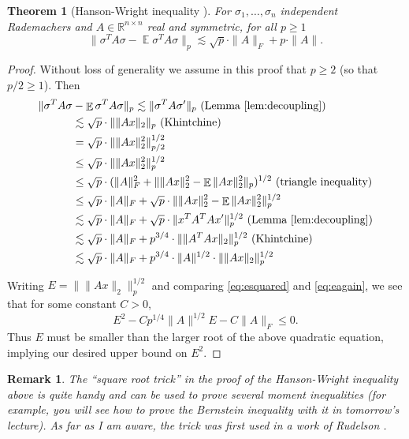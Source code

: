 \documentclass[12pt]{article}
\DeclareMathOperator*{\E}{\mathbb{E}}
\newcommand{\R}{\mathbb{R}}
\newtheorem{theorem}{Theorem}
\newtheorem{remark}{Remark}
\newcommand{\EquationName}[1]{\label{eq:#1}}
\newcommand{\TheoremName}[1]{\label{thm:#1}}
\newcommand{\Lemma}[1]{Lemma~\ref{lem:#1}}
\newcommand{\Eqsub}[1]{\eqref{eq:#1}}
\begin{document}
\begin{theorem}[Hanson-Wright inequality {\cite{HansonW71}}]\TheoremName{hw}
For $\sigma_1,\ldots,\sigma_n$ independent Rademachers and $A\in\R^{n\times n}$ real and symmetric, for all $p\ge 1$
$$
\|\sigma^T A \sigma - \E \sigma^T A \sigma\|_p \lesssim \sqrt{p} \cdot \|A\|_F + p\cdot \|A\| .
$$
\end{theorem}
\begin{proof}
Without loss of generality we assume in this proof that $p\ge 2$ (so that $p/2 \ge 1$). Then
\allowdisplaybreaks
\begin{align}
\|\sigma^T A \sigma &- \E \sigma^T A \sigma\|_p \lesssim \|\sigma^T A \sigma'\|_p\text{ (\Lemma{decoupling})} \EquationName{hwstart}\\
{}&\lesssim \sqrt{p} \cdot \| \|Ax\|_2 \|_p \text{ (Khintchine)} \EquationName{esquared}\\
{}& = \sqrt{p} \cdot \| \|Ax\|_2^2 \|_{p/2}^{1/2} \EquationName{induction}\\
\nonumber {}& \le \sqrt{p} \cdot \| \|Ax\|_2^2 \|_p^{1/2} \\
\nonumber {}& \le \sqrt{p} \cdot (\|A\|_F^2 + \|\|Ax\|_2^2 - \E \|Ax\|_2^2 \|_p)^{1/2} \text{ (triangle inequality)}\\
\nonumber {}& \le \sqrt{p} \cdot \|A\|_F + \sqrt{p}\cdot \|\|Ax\|_2^2 - \E \|Ax\|_2^2 \|_p^{1/2}\\
\nonumber {}& \lesssim \sqrt{p} \cdot \|A\|_F + \sqrt{p}\cdot \|x^T A^T A x'\|_p^{1/2}\text{ (\Lemma{decoupling})}\\
\nonumber {}& \lesssim \sqrt{p} \cdot \|A\|_F + p^{3/4}\cdot \|\|A^T Ax\|_2\|_p^{1/2}\text{ (Khintchine)}\\
{}& \lesssim \sqrt{p} \cdot \|A\|_F + p^{3/4}\cdot\|A\|^{1/2} \cdot\|\|Ax\|_2\|_p^{1/2} \EquationName{eagain}
\end{align}

Writing $E = \|\|Ax\|_2\|_p^{1/2}$ and comparing \Eqsub{esquared} and \Eqsub{eagain}, we see that for some constant $C > 0$,
$$
E^2 - Cp^{1/4}\|A\|^{1/2} E - C\|A\|_F \le 0 .
$$
Thus $E$ must be smaller than the larger root of the above quadratic equation, implying our desired upper bound on $E^2$.
\end{proof}

\begin{remark}
\textup{
The ``square root trick'' in the proof of the Hanson-Wright inequality above is quite handy and can be used to prove several moment inequalities (for example, you will see how to prove the Bernstein inequality with it in tomorrow's lecture). As far as I am aware, the trick was first used in a work of Rudelson \cite{Rudelson99}.
}
\end{remark}
\end{document}

